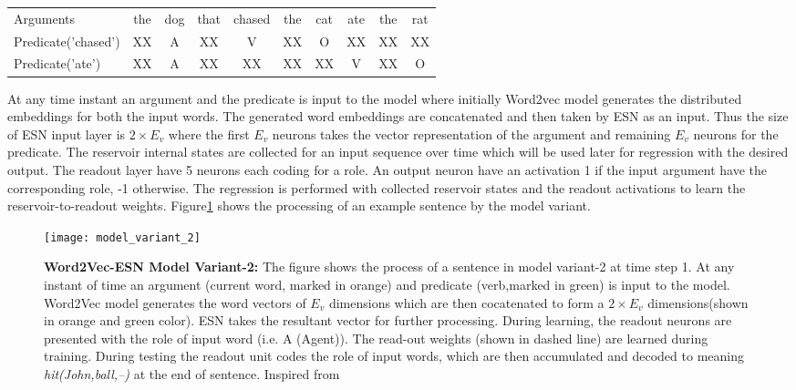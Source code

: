 \begin{table}[!htb]
\centering
\label{tab:argument-predicate}
\begin{tabular}{lccccccccc}
Arguments           & the & dog & that & chased & the & cat & ate & the & rat \\
Predicate('chased') & XX  & A   & XX   & V      & XX  & O   & XX  & XX  & XX  \\
Predicate('ate')    & XX  & A   & XX   & XX     & XX  & XX  & V   & XX  & O  
\end{tabular}
\end{table}

 At any time instant an argument and the predicate is input to the model where initially Word2vec model generates the distributed embeddings for both the input words. The generated word embeddings are concatenated and then taken by ESN as an input. Thus the size of ESN input layer is $2 \times E_{v}$ where the first $E_{v}$ neurons takes the vector representation of the argument and remaining $E_{v}$ neurons for the predicate. The reservoir internal states are collected for an input sequence over time which will be used later for regression with the desired output. The readout layer have 5 neurons each coding for a role. An output neuron have an activation 1 if the input argument have the corresponding role, -1 otherwise. The regression is performed with collected reservoir states and the readout activations to learn the reservoir-to-readout weights. Figure\ref{fig:model_variant_2} shows the processing of an example sentence by the model variant.

\begin{figure}[hbtp]
\centering
\texttt{[image: model\_variant\_2]}
\caption{\textbf{Word2Vec-ESN Model Variant-2:} 
The figure shows the process of a sentence in model variant-2 at time step 1. At any instant of time an argument (current word, marked in orange) and predicate (verb,marked in green) is input to the model. Word2Vec model generates the word vectors of $E_{v}$ dimensions which are then cocatenated to form a $2 \times E_{v}$ dimensions(shown in orange and green color). ESN takes the resultant vector for further processing. During learning, the readout neurons are presented with the role of input word (i.e. A (Agent)). The read-out weights (shown in dashed line) are learned during training. During testing the readout unit codes the role of input words, which are then accumulated and decoded to meaning \textit{hit(John,ball,--)} at the end of sentence. Inspired from \cite{xavier:2013:RT}
}
\label{fig:model_variant_2}
\end{figure}


